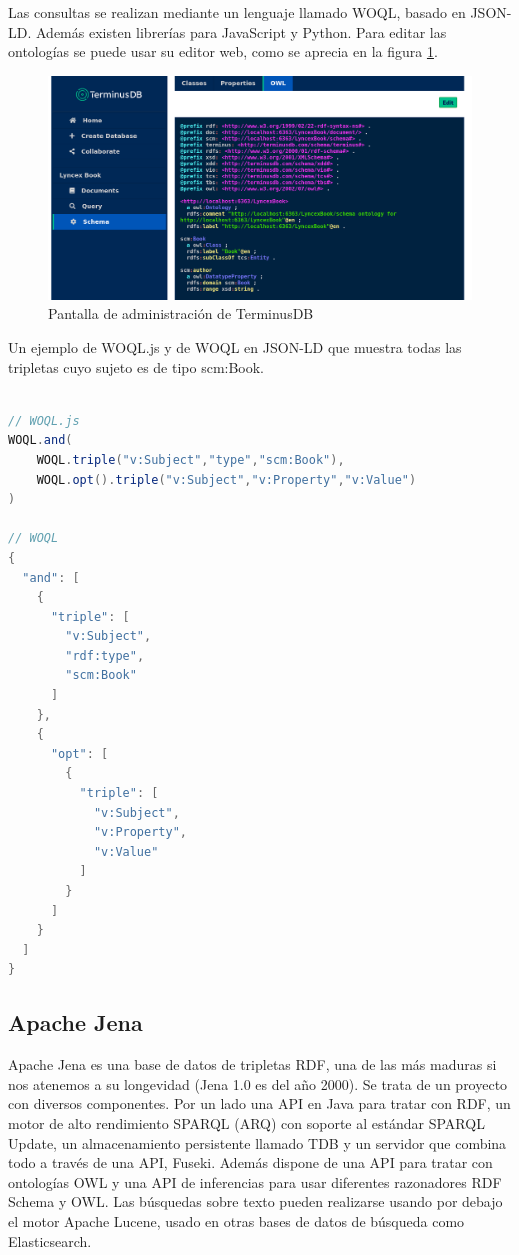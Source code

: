 \documentclass[12pt]{report} %
\begin{document}
Las consultas se realizan mediante un lenguaje llamado WOQL, basado en JSON-LD. Además existen librerías para JavaScript y Python. Para editar las ontologías se puede usar su editor web, como se aprecia en la figura \ref{fig:terminusdb}.

\begin{figure}[h]
    \centering
    \includegraphics[width=\textwidth]{terminusdb.png}
    \caption{Pantalla de administración de TerminusDB}
    \label{fig:terminusdb}
\end{figure}

Un ejemplo de WOQL.js y de WOQL en JSON-LD que muestra todas las tripletas cuyo sujeto es de tipo scm:Book.

\begin{lstlisting}[language=Java, float, floatplacement=H]

// WOQL.js
WOQL.and(
    WOQL.triple("v:Subject","type","scm:Book"),
    WOQL.opt().triple("v:Subject","v:Property","v:Value")
)

// WOQL
{
  "and": [
    {
      "triple": [
        "v:Subject",
        "rdf:type",
        "scm:Book"
      ]
    },
    {
      "opt": [
        {
          "triple": [
            "v:Subject",
            "v:Property",
            "v:Value"
          ]
        }
      ]
    }
  ]
}
\end{lstlisting}

\subsection{Apache Jena}
Apache Jena es una base de datos de tripletas RDF, una de las más maduras si nos atenemos a su longevidad (Jena 1.0 es del año 2000).\cite{jena}
Se trata de un proyecto con diversos componentes. Por un lado una API en Java para tratar con RDF, un motor de alto rendimiento SPARQL (ARQ) con soporte al estándar SPARQL Update, un almacenamiento persistente llamado TDB y un servidor que combina todo a través de una API, Fuseki. Además dispone de una API para tratar con ontologías OWL y una API de inferencias para usar diferentes razonadores RDF Schema y OWL. Las búsquedas sobre texto pueden realizarse usando por debajo el motor Apache Lucene, usado en otras bases de datos de búsqueda como Elasticsearch.
\end{document}
